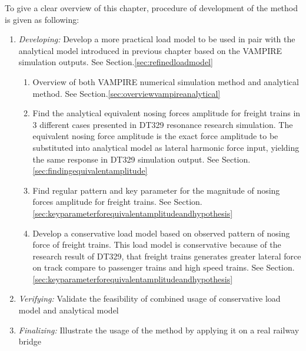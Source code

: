 To give a clear overview of this chapter, procedure of development of the method is given as following:

\begin{enumerate}
    \item \textit{Developing:} Develop a more practical load model to be used in pair with the analytical model introduced in previous chapter based on the VAMPIRE simulation outputs. See Section.\ref{sec:refinedloadmodel}
        \begin{enumerate}[label*=\arabic*.]
            \item Overview of both VAMPIRE numerical simulation method and analytical method. See Section.\ref{sec:overviewvampireanalytical}
            \item Find the analytical equivalent nosing forces amplitude for freight trains in 3 different cases presented in DT329 resonance research simulation. The equivalent nosing force amplitude is the exact force amplitude to be substituted into analytical model as lateral harmonic force input, yielding the same response in DT329 simulation output. See Section.\ref{sec:findingequivalentamplitude}
            \item Find regular pattern and key parameter for the magnitude of nosing forces amplitude for freight trains. See Section.\ref{sec:keyparameterforequivalentamplitudeandhypothesis}
            \item Develop a conservative load model based on observed pattern of nosing force of freight trains. This load model is conservative because of the research result of DT329, that freight trains generates greater lateral force on track compare to passenger trains and high speed trains. See Section.\ref{sec:keyparameterforequivalentamplitudeandhypothesis}
        \end{enumerate} 
    \item \textit{Verifying:} Validate the feasibility of combined usage of conservative load model and analytical model
    \item \textit{Finalizing:} Illustrate the usage of the method by applying it on a real railway bridge
\end{enumerate}


